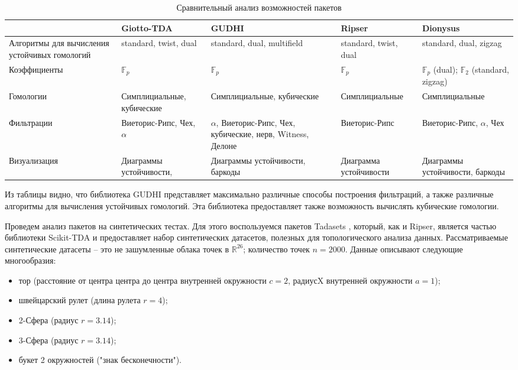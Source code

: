 \begin{table}[!htbp]
	\centering
	\small
	\caption{Сравнительный анализ возможностей пакетов}	
	\begin{tabularx}{\linewidth}{|X|X|X|X|X|}
		\hline
		& Giotto-TDA & GUDHI & Ripser& Dionysus\\ \hline
		Алгоритмы для вычисления  устойчивых гомологий & standard, twist, dual& standard, dual, multifield & standard, twist, dual & standard, dual, zigzag \\ \hline
		Коэффициенты & $\mathbb{F}_p$ & $\mathbb{F}_p$ & $\mathbb{F}_p$ & $\mathbb{F}_p$ (dual);  $\mathbb{F}_2$ (standard, zigzag) \\ \hline
		Гомологии & Симплициальные, кубические& Симплициальные, кубические & Симплициальные & Симплициальные \\ \hline
		Фильтрации  & Виеторис-Рипс, Чех, $\alpha$ & $\alpha$, Виеторис-Рипс, Чех, кубические, нерв, Witness, Делоне& Виеторис-Рипс  & Виеторис-Рипс, $\alpha$, Чех\\ \hline
		Визуализация & Диаграммы устойчивости, & Диаграммы устойчивости, баркоды &Диаграмма устойчивости & Диаграммы устойчивости, баркоды \\ \hline
	\end{tabularx}
\label{tabl:packages}
\end{table}

Из таблицы видно, что библиотека GUDHI представляет максимально различные способы построения фильтраций, а также различные алгоритмы для вычисления устойчивых гомологий. Эта библиотека предоставляет также возможность вычислять кубические гомологии.

Проведем анализ пакетов на синтетических тестах. Для этого воспользуемся пакетов Tadasets \cite{Tadasets}, который, как и Ripser, является частью библиотеки Scikit-TDA \cite{scikit} и предоставляет набор синтетических датасетов, полезных для топологического анализа данных. Рассматриваемые синтетические датасеты -- это не зашумленные облака точек в $\mathbb{R}^{26}$; количество точек $n=2000$. Данные описывают следующие многообразия:
\begin{itemize}
	\item тор (расстояние от центра центра до центра внутренней окружности $c=2$, радиусX внутренней окружности $a=1$);
	\item швейцарский рулет (длина рулета $r=4$);
	\item 2-Сфера (радиус $r=3.14$);
	\item 3-Сфера (радиус $r=3.14$);
	\item букет 2 окружностей ("знак бесконечности").
\end{itemize}

